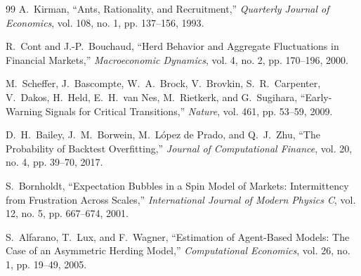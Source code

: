 \documentclass[11pt,a4paper]{article}
\begin{document}
\begin{thebibliography}{99}
A.~Kirman,
``Ants, Rationality, and Recruitment,''
\emph{Quarterly Journal of Economics}, vol. 108, no. 1, pp. 137--156, 1993.

R.~Cont and J.-P.~Bouchaud,
``Herd Behavior and Aggregate Fluctuations in Financial Markets,''
\emph{Macroeconomic Dynamics}, vol. 4, no. 2, pp. 170--196, 2000.

M.~Scheffer, J.~Bascompte, W.~A.~Brock, V.~Brovkin, S.~R.~Carpenter,
V.~Dakos, H.~Held, E.~H.~van Nes, M.~Rietkerk, and G.~Sugihara,
``Early-Warning Signals for Critical Transitions,''
\emph{Nature}, vol. 461, pp. 53--59, 2009.

D.~H.~Bailey, J.~M.~Borwein, M.~L{\'o}pez de Prado, and Q.~J.~Zhu,
``The Probability of Backtest Overfitting,''
\emph{Journal of Computational Finance}, vol. 20, no. 4, pp. 39--70, 2017.

S.~Bornholdt,
``Expectation Bubbles in a Spin Model of Markets: Intermittency from Frustration Across Scales,''
\emph{International Journal of Modern Physics C}, vol. 12, no. 5, pp. 667--674, 2001.

S.~Alfarano, T.~Lux, and F.~Wagner,
``Estimation of Agent-Based Models: The Case of an Asymmetric Herding Model,''
\emph{Computational Economics}, vol. 26, no. 1, pp. 19--49, 2005.

\end{thebibliography}
\end{document}
